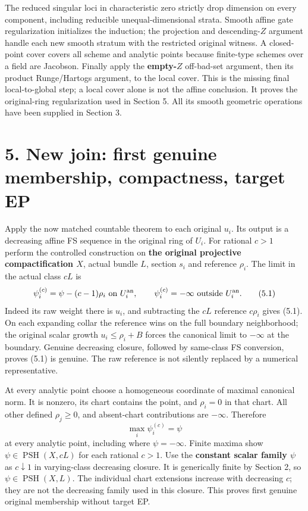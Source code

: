 \documentclass[
  10pt,
]{article}
\begin{document}
The reduced singular loci in characteristic zero strictly drop dimension
on every component, including reducible unequal-dimensional strata.
Smooth affine gate regularization initializes the induction; the
projection and descending-\(Z\) argument handle each new smooth stratum
with the restricted original witness. A closed-point cover covers all
scheme and analytic points because finite-type schemes over a field are
Jacobson. Finally apply the \textbf{empty-\(Z\)} off-bad-set argument,
then its product Runge/Hartogs argument, to the local cover. This is the
missing final local-to-global step; a local cover alone is not the
affine conclusion. It proves the original-ring regularization used in
Section 5. All its smooth geometric operations have been supplied in
Section 3.

\section{5. New join: first genuine membership, compactness, target
EP}\label{new-join-first-genuine-membership-compactness-target-ep}

Apply the now matched countable theorem to each original \(u_i\). Its
output is a decreasing affine FS sequence in the original ring of
\(U_i\). For rational \(c>1\) perform the controlled construction on
\textbf{the original projective compactification \(X\)}, actual bundle
\(L\), section \(s_i\) and reference \(\rho_i\). The limit in the actual
class \(cL\) is \[
 \psi_i^{(c)}=\psi-(c-1)\rho_i\text{ on }U_i^{\rm an},\qquad
 \psi_i^{(c)}=-\infty\text{ outside }U_i^{\rm an}.
 \tag{5.1}
\] Indeed its raw weight there is \(u_i\), and subtracting the \(cL\)
reference \(c\rho_i\) gives (5.1). On each expanding collar the
reference wins on the full boundary neighborhood; the original scalar
growth \(u_i\le\rho_i+B\) forces the canonical limit to \(-\infty\) at
the boundary. Genuine decreasing closure, followed by same-class FS
conversion, proves (5.1) is genuine. The raw reference is not silently
replaced by a numerical representative.

At every analytic point choose a homogeneous coordinate of maximal
canonical norm. It is nonzero, its chart contains the point, and
\(\rho_i=0\) in that chart. All other defined \(\rho_j\ge0\), and
absent-chart contributions are \(-\infty\). Therefore
\[\max_i\psi_i^{(c)}=\psi\] at every analytic point, including where
\(\psi=-\infty\). Finite maxima show \(\psi\in\operatorname{PSH}(X,cL)\)
for each rational \(c>1\). Use the \textbf{constant scalar family
\(\psi\)} as \(c\downarrow1\) in varying-class decreasing closure. It is
generically finite by Section 2, so \(\psi\in\operatorname{PSH}(X,L)\).
The individual chart extensions increase with decreasing \(c\); they are
not the decreasing family used in this closure. This proves first
genuine original membership without target EP.
\end{document}
